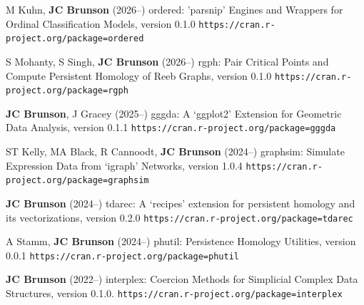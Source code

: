 \documentclass[10pt,a4paper]{article}
\begin{document}
\begin{enumerate}[label={[\arabic*]},labelindent=1cm,nolistsep]
\setcounter{enumi}{\value{paper}}
\item
M Kuhn, {\bfseries JC Brunson} (2026--) {\sffamily ordered}: 'parsnip' Engines and Wrappers for Ordinal Classification Models, version 0.1.0 {\tt\small\nolinkurl{https://cran.r-project.org/package=ordered}}
\item
S Mohanty, S Singh, {\bfseries JC Brunson} (2026--) {\sffamily rgph}: Pair Critical Points and Compute Persistent Homology of Reeb Graphs, version 0.1.0 {\tt\small\nolinkurl{https://cran.r-project.org/package=rgph}}
\item
{\bfseries JC Brunson}, J Gracey (2025--) {\sffamily gggda}: A `ggplot2' Extension for Geometric Data Analysis, version 0.1.1 {\tt\small\nolinkurl{https://cran.r-project.org/package=gggda}}
\item
ST Kelly, MA Black, R Cannoodt, {\bfseries JC Brunson} (2024--) {\sffamily graphsim}: Simulate Expression Data from `igraph' Networks, version 1.0.4 {\tt\small\nolinkurl{https://cran.r-project.org/package=graphsim}}
\item
{\bfseries JC Brunson} (2024--) {\sffamily tdarec}: A `recipes' extension for persistent homology and its vectorizations, version 0.2.0 {\tt\small\nolinkurl{https://cran.r-project.org/package=tdarec}}
\item
A Stamm, {\bfseries JC Brunson} (2024--) {\sffamily phutil}: Persistence Homology Utilities, version 0.0.1 {\tt\small\nolinkurl{https://cran.r-project.org/package=phutil}}
\item
{\bfseries JC Brunson} (2022--) {\sffamily interplex}: Coercion Methods for Simplicial Complex Data Structures, version 0.1.0. {\tt\small\nolinkurl{https://cran.r-project.org/package=interplex}}

\end{enumerate}
\end{document}
